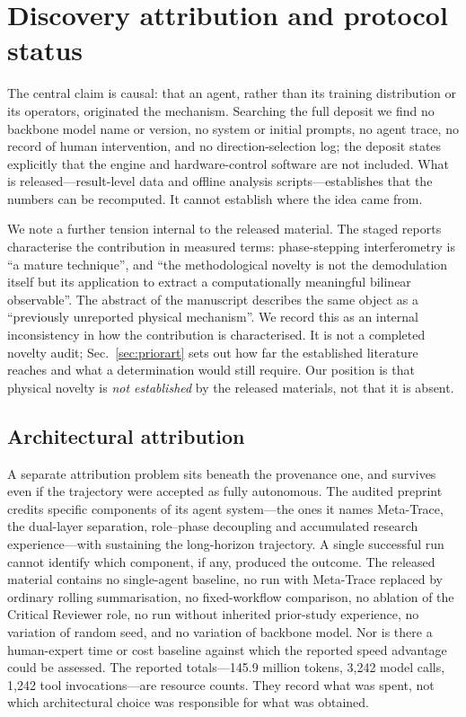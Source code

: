 \documentclass[11pt,a4paper]{article}
\begin{document}
\section{Discovery attribution and protocol status}
\label{sec:provenance}

The central claim is causal: that an agent, rather than its training
distribution or its operators, originated the mechanism. Searching the full
deposit we find no backbone model name or version, no system or initial
prompts, no agent trace, no record of human intervention, and no
direction-selection log; the deposit states explicitly that the engine and
hardware-control software are not included. What is released---result-level
data and offline analysis scripts---establishes that the numbers can be
recomputed. It cannot establish where the idea came from.

We note a further tension internal to the released material. The staged
reports characterise the contribution in measured terms: phase-stepping
interferometry is ``a mature technique'', and ``the methodological novelty is
not the demodulation itself but its application to extract a computationally
meaningful bilinear observable''. The abstract of the manuscript describes the
same object as a ``previously unreported physical mechanism''. We record this
as an internal inconsistency in how the contribution is characterised. It is
not a completed novelty audit; Sec.~\ref{sec:priorart} sets out how far the
established literature reaches and what a determination would still require.
Our position is that physical novelty is \emph{not established} by the
released materials, not that it is absent.

\subsection{Architectural attribution}

A separate attribution problem sits beneath the provenance one, and survives
even if the trajectory were accepted as fully autonomous. The audited preprint
credits specific components of its agent system---the ones it names Meta-Trace,
the dual-layer separation, role--phase decoupling and accumulated research
experience---with sustaining the long-horizon trajectory. A single successful run cannot
identify which component, if any, produced the outcome. The released material
contains no single-agent baseline, no run with Meta-Trace replaced by ordinary
rolling summarisation, no fixed-workflow comparison, no ablation of the
Critical Reviewer role, no run without inherited prior-study experience, no
variation of random seed, and no variation of backbone model. Nor is there a
human-expert time or cost baseline against which the reported speed advantage
could be assessed. The reported totals---145.9 million tokens, 3{,}242 model
calls, 1{,}242 tool invocations---are resource counts. They record what was
spent, not which architectural choice was responsible for what was obtained.
\end{document}
